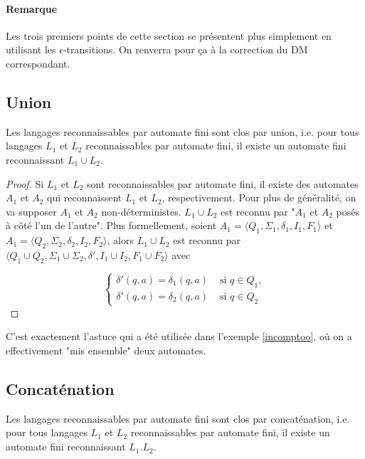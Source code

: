 \paragraph*{Remarque} Les trois premiers points de cette section se présentent plus simplement en utilisant les $\epsilon$-transitions. On renverra pour ça à la correction du DM correspondant.

\subsection{Union}

\begin{theorem}
Les langages reconnaissables par automate fini sont clos par union, i.e. pour tous langages $L_1$ et $L_2$ reconnaissables par automate fini, il existe un automate fini reconnaissant $L_1 \cup L_2$.
\end{theorem}

\begin{proof}

Si $L_1$ et $L_2$ sont reconnaissables par automate fini, il existe des automates $A_1$ et $A_2$ qui reconnaissent $L_1$ et $L_2$, respectivement. Pour plus de généralité, on va supposer $A_1$ et $A_2$ non-déterministes. $L_1 \cup L_2$ est reconnu par "$A_1$ et $A_2$ posés à côté l'un de l'autre". Plus formellement, soient $A_1 = \big \langle Q_1, \Sigma_1, \delta_1, I_1, F_1\big \rangle$ et $A_1 = \big \langle Q_2, \Sigma_2, \delta_2, I_2, F_2\big \rangle$, alors $L_1 \cup L_2$ est reconnu par $\big \langle Q_1 \cup Q_2, \Sigma_1 \cup \Sigma_2, \delta', I_1 \cup I_2, F_1 \cup F_2\big \rangle$ avec 

\[
\begin{cases}
\delta'(q,a) = \delta_1(q,a) &\text{ si } q \in Q_1,\\[1ex]
\delta'(q,a) = \delta_2(q,a) &\text{ si } q \in Q_2\end{cases}
\]

\end{proof}

C'est exactement l'astuce qui a été utilisée dans l'exemple \ref{incomptoo}, où on a effectivement "mis ensemble" deux automates.

\subsection{Concaténation}

\begin{theorem}
Les langages reconnaissables par automate fini sont clos par concaténation, i.e. pour tous langages $L_1$ et $L_2$ reconnaissables par automate fini, il existe un automate fini reconnaissant $L_1.L_2$.
\end{theorem}

